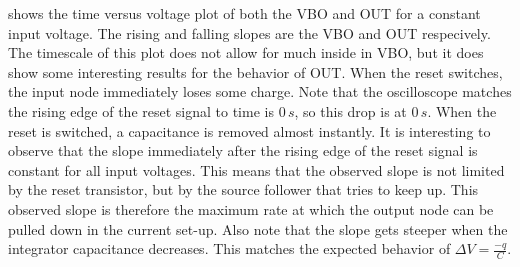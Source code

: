 

 shows the time versus voltage plot of both the VBO and OUT for a constant input voltage. The rising and falling slopes are the VBO and OUT respecively. The timescale of this plot does not allow for much inside in VBO, but it does show some interesting results for the behavior of OUT. When the reset switches, the input node immediately loses some charge. Note that the oscilloscope matches the rising edge of the reset signal to time is $0\,s$, so this drop is at $0\,s$. When the reset is switched, a capacitance is removed almost instantly. It is interesting to observe that the slope immediately after the rising edge of the reset signal is constant for all input voltages. This means that the observed slope is not limited by the reset transistor, but by the source follower that tries to keep up. This observed slope is therefore the maximum rate at which the output node can be pulled down in the current set-up. Also note that the slope gets steeper when the integrator capacitance decreases. This matches the expected behavior of $\Delta V = \frac{-q}{C}$.



